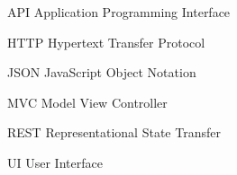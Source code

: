 
\begin{siglas}
 \item[API] Application Programming Interface
 \item[HTTP] Hypertext Transfer Protocol
 \item[JSON] JavaScript Object Notation
 \item[MVC] Model View Controller
 \item[REST] Representational State Transfer
 \item[UI] User Interface
\end{siglas}

